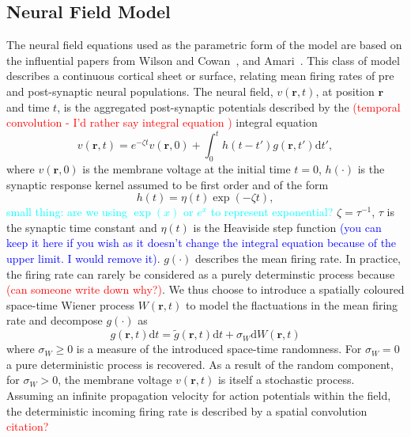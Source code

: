 \documentclass[]{article}
\newcommand{\red}{\textcolor{red}}
\newcommand{\blue}{\textcolor{blue}}
\newcommand{\cyan}{\textcolor{cyan}}
\begin{document}
\subsection{Neural Field Model}
The neural field equations used as the parametric form of the model are based on the influential papers from Wilson and Cowan~\cite{Wilson1973}, and Amari~\cite{Amari1977}. This class of model describes a continuous cortical sheet or surface, relating mean firing rates of pre and post-synaptic neural populations. The neural field, $v\left( {\mathbf{r},t} \right)$, at position $\mathbf{r}$ and time $t$, is the aggregated post-synaptic potentials described by the \red{(temporal convolution - I'd rather say integral equation	)} integral equation 
\begin{equation}
	\label{SpikesToPotential} v\left( {\mathbf{r},t} \right) = e^{-\zeta t}v\left( {\mathbf{r},0} \right) + \int_{0}^t {h\left( {t - t'} \right)g\left( {\mathbf{r},t'} \right)\textrm{d}t'}, 
\end{equation}   
where $v\left( {\mathbf{r},0} \right)$ is the membrane voltage at the initial time $t = 0$, $h(\cdot)$ is the synaptic response kernel assumed to be first order and of the form 
\begin{equation}
	\label{SynapticRespKernel} h(t) = \eta(t)\exp{\left(-\zeta t\right)}, 
\end{equation}
\cyan{small thing: are we using $\exp(x)$ or $e^x$ to represent exponential?}
$\zeta=\tau^{-1}$, $\tau$ is the synaptic time constant and $\eta(t)$ is the Heaviside step function \blue{(you can keep it here if you wish as it doesn't change the integral equation because of the upper limit. I would remove it)}. $g(\cdot)$ describes the mean firing rate. In practice, the firing rate can rarely be considered as a purely determinstic process because \red{(can someone write down why?)}. We thus choose to introduce a spatially coloured space-time Wiener process $W(\mathbf{r},t)$ to model the flactuations in the mean firing rate and decompose $g(\cdot)$ as
\begin{equation}\label{DecompositionOfg}
g(\mathbf{r},t)\textrm{d}t = \tilde{g}(\mathbf{r},t)\textrm{d}t + \sigma_W \textrm{d}W(\mathbf{r},t) 
\end{equation}
where $\sigma_W \ge 0$ is a measure of the introduced space-time randomness. For $\sigma_W = 0$ a pure deterministic process is recovered. As a result of the random component, for $\sigma_W > 0$, the membrane voltage $v(\mathbf{r},t)$ is itself a stochastic process. Assuming an infinite propagation velocity for action potentials within the field, the deterministic incoming firing rate is described by a spatial convolution \red{citation?}
\end{document}
